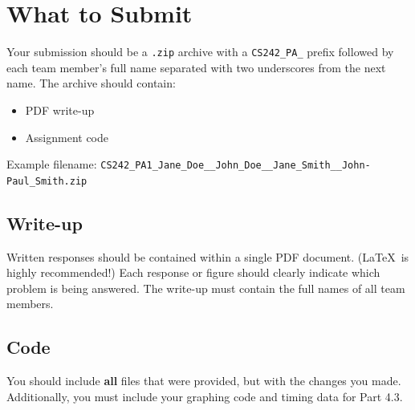 \documentclass[a4 paper]{article}
\begin{document}
\section{What to Submit}
Your submission should be a \texttt{.zip} archive with a \texttt{CS242\_PA\_} prefix followed by each team member's full name separated with two underscores from the next name. The archive should contain:
\begin{itemize}
    \item PDF write-up
    \item Assignment code
\end{itemize}

\noindent
Example filename: \texttt{CS242\_PA1\_Jane\_Doe\_\_John\_Doe\_\_Jane\_Smith\_\_John-Paul\_Smith.zip}\\

\subsection*{Write-up}
Written responses should be contained within a single PDF document.
(\LaTeX~is highly recommended!)
Each response or figure should clearly indicate which problem is being answered.
The write-up must contain the full names of all team members.

\subsection*{Code}
You should include \textbf{all} files that were provided, but with the changes you made.
Additionally, you must include your graphing code and timing data for Part 4.3.
\end{document}
